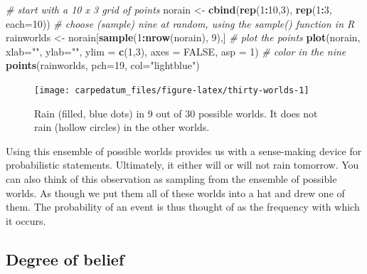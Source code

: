 \documentclass[openany]{book}
\newenvironment{Shaded}{\begin{snugshade}}{\end{snugshade}}
\newcommand{\CommentTok}[1]{\textcolor[rgb]{0.56,0.35,0.01}{\textit{#1}}}
\newcommand{\DataTypeTok}[1]{\textcolor[rgb]{0.13,0.29,0.53}{#1}}
\newcommand{\DecValTok}[1]{\textcolor[rgb]{0.00,0.00,0.81}{#1}}
\newcommand{\KeywordTok}[1]{\textcolor[rgb]{0.13,0.29,0.53}{\textbf{#1}}}
\newcommand{\NormalTok}[1]{#1}
\newcommand{\OperatorTok}[1]{\textcolor[rgb]{0.81,0.36,0.00}{\textbf{#1}}}
\newcommand{\OtherTok}[1]{\textcolor[rgb]{0.56,0.35,0.01}{#1}}
\newcommand{\StringTok}[1]{\textcolor[rgb]{0.31,0.60,0.02}{#1}}
\begin{document}
\begin{Shaded}
\begin{Highlighting}[]
\CommentTok{# start with a 10 x 3 grid of points}
\NormalTok{norain <-}\StringTok{ }\KeywordTok{cbind}\NormalTok{(}\KeywordTok{rep}\NormalTok{(}\DecValTok{1}\OperatorTok{:}\DecValTok{10}\NormalTok{,}\DecValTok{3}\NormalTok{), }\KeywordTok{rep}\NormalTok{(}\DecValTok{1}\OperatorTok{:}\DecValTok{3}\NormalTok{, }\DataTypeTok{each=}\DecValTok{10}\NormalTok{))  }
\CommentTok{# choose (sample) nine at random, using the sample() function in R}
\NormalTok{rainworlds <-}\StringTok{ }\NormalTok{norain[}\KeywordTok{sample}\NormalTok{(}\DecValTok{1}\OperatorTok{:}\KeywordTok{nrow}\NormalTok{(norain), }\DecValTok{9}\NormalTok{),]  }
\CommentTok{# plot the points}
\KeywordTok{plot}\NormalTok{(norain, }\DataTypeTok{xlab=}\StringTok{""}\NormalTok{, }\DataTypeTok{ylab=}\StringTok{""}\NormalTok{, }\DataTypeTok{ylim =} \KeywordTok{c}\NormalTok{(}\DecValTok{1}\NormalTok{,}\DecValTok{3}\NormalTok{), }\DataTypeTok{axes =} \OtherTok{FALSE}\NormalTok{, }\DataTypeTok{asp =} \DecValTok{1}\NormalTok{) }
\CommentTok{# color in the nine}
\KeywordTok{points}\NormalTok{(rainworlds, }\DataTypeTok{pch=}\DecValTok{19}\NormalTok{, }\DataTypeTok{col=}\StringTok{"lightblue"}\NormalTok{) }
\end{Highlighting}
\end{Shaded}

\begin{figure}[H]

{\centering \texttt{[image: carpedatum\_files/figure-latex/thirty-worlds-1]} 

}

\caption{Rain (filled, blue dots) in 9 out of 30 possible worlds. It does not rain (hollow circles) in the other worlds.}\label{fig:thirty-worlds}
\end{figure}

Using this ensemble of possible worlds provides us with a sense-making device for probabilistic statements. Ultimately, it either will or will not rain tomorrow. You can also think of this observation as sampling from the ensemble of possible worlds. As though we put them all of these worlds into a hat and drew one of them. The probability of an event is thus thought of as the frequency with which it occurs.

\hypertarget{degree-of-belief}{%
\subsection*{Degree of belief}\label{degree-of-belief}}
\end{document}
